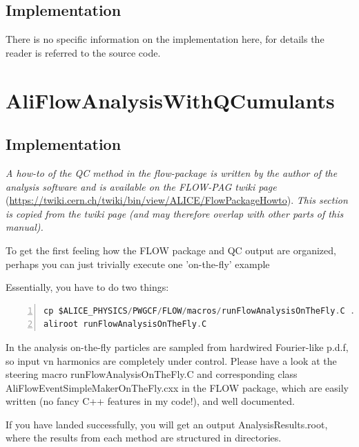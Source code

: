 \documentclass[a4paper]{book}
\numberwithin{equation}{subsection}
\begin{document}
\subsection{Implementation}
There is no specific information on the implementation here, for details the reader is referred to the source code.

\section{AliFlowAnalysisWithQCumulants}\label{sec:QC}
\subsection{Implementation}
\emph{A how-to of the QC method in the flow-package is written by the author of the analysis software and is available on the FLOW-PAG twiki page} (\href{https://twiki.cern.ch/twiki/bin/view/ALICE/FlowPackageHowto}{https://twiki.cern.ch/twiki/bin/view/ALICE/FlowPackageHowto}). \emph{This section is copied from the twiki page (and may therefore overlap with other parts of this manual).}

 To get the first feeling how the FLOW package and QC output are organized, perhaps you can just trivially execute one 'on-the-fly' example 

 Essentially, you have to do two things: 
	\begin{lstlisting}[language=C, numbers=left]
cp $ALICE_PHYSICS/PWGCF/FLOW/macros/runFlowAnalysisOnTheFly.C .
aliroot runFlowAnalysisOnTheFly.C \end{lstlisting}

 In the analysis on-the-fly particles are sampled from hardwired Fourier-like p.d.f, so input vn harmonics are completely under control. Please have a look at the steering macro runFlowAnalysisOnTheFly.C and corresponding class AliFlowEventSimpleMakerOnTheFly.cxx in the FLOW package, which are easily written (no fancy C++ features in my code!), and well documented. 

 If you have landed successfully, you will get an output AnalysisResults.root, where the results from each method are structured in directories. 
\end{document}
